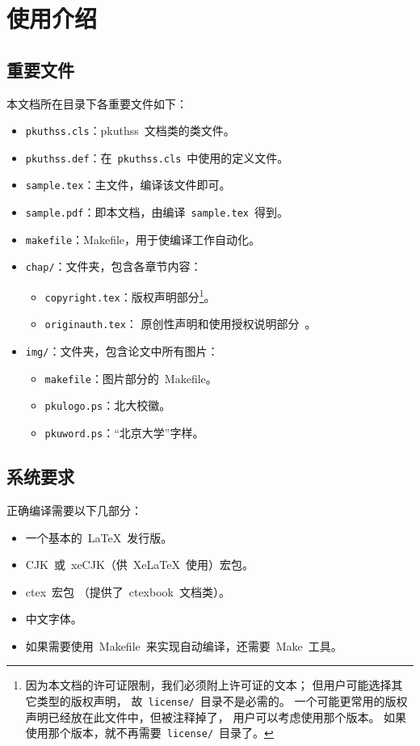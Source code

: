 \chapter{使用介绍}
	\section{重要文件}

	本文档所在目录下各重要文件如下：
	\begin{itemize}\denseenum
		\item \verb|pkuthss.cls|：pkuthss~文档类的类文件。
		\item \verb|pkuthss.def|：在~\verb|pkuthss.cls|~中使用的定义文件。
		\item \verb|sample.tex|：主文件，编译该文件即可。
		\item \verb|sample.pdf|：即本文档，由编译~\verb|sample.tex|~得到。
		\item \verb|makefile|：Makefile，用于使编译工作自动化。
		\item \verb|chap/|：文件夹，包含各章节内容：
		\begin{itemize}\denseenum
			\item \verb|copyright.tex|：版权声明部分\footnote%
			{%
				因为本文档的许可证限制，我们必须附上许可证的文本；
				但用户可能选择其它类型的版权声明，
				故~\texttt{license/}\linebreak[1]~目录不是必需的。
				一个可能更常用的版权声明已经放在此文件中，但被注释掉了，
				用户可以考虑使用那个版本。
				如果使用那个版本，就不再需要~\texttt{license/}~目录了。
			}。
			\item \verb|originauth.tex|：
				原创性声明和使用授权说明部分~\supercite{F11}。
		\end{itemize}
		\item \verb|img/|：文件夹，包含论文中所有图片：
		\begin{itemize}\denseenum
			\item \verb|makefile|：图片部分的~Makefile。
			\item \verb|pkulogo.ps|：北大校徽。
			\item \verb|pkuword.ps|：“北京大学”字样。
		\end{itemize}
	\end{itemize}

	\section{系统要求}

	正确编译需要以下几部分：
	\begin{itemize}\denseenum
		\item 一个基本的~\LaTeX{}~发行版。
		\item CJK~或~xeCJK（供~Xe\LaTeX{}~使用）宏包。
		\item ctex~宏包\supercite{ctex-doc,ctexfaq}%
			（提供了~ctexbook~文档类）。
		\item 中文字体。
		\item 如果需要使用~Makefile~来实现自动编译，还需要~Make~工具。
	\end{itemize}

